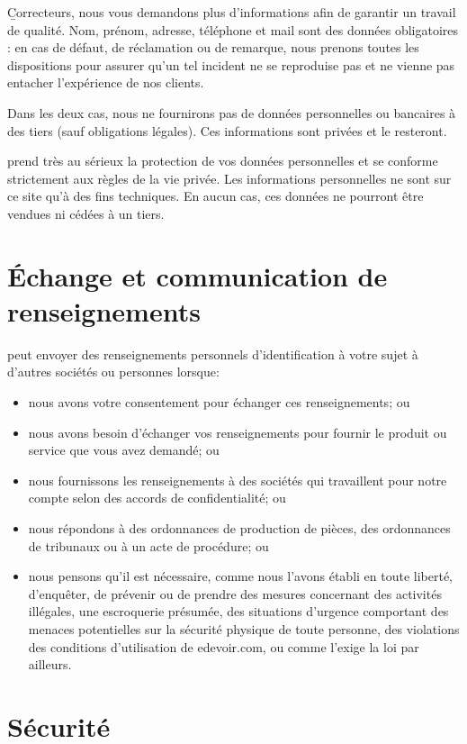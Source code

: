 \b{Correcteurs}, nous vous demandons plus d'informations afin de garantir un travail de qualité.  Nom, prénom, adresse, téléphone et mail sont des données obligatoires : en cas de défaut, de réclamation ou de remarque, nous prenons toutes les dispositions pour assurer qu'un tel incident ne se reproduise pas et ne vienne pas entacher l'expérience de nos clients.

Dans les deux cas, nous ne fournirons pas de données personnelles ou bancaires à des tiers (sauf obligations légales). Ces informations sont privées et le resteront.

\eDevoir prend très au sérieux la protection de vos données personnelles et se conforme strictement aux règles de la vie privée. Les informations personnelles ne sont sur ce site qu'à des fins techniques. En aucun cas, ces données ne pourront être vendues ni cédées à un tiers.

\section{Échange et communication de renseignements}

\eDevoir peut envoyer des renseignements personnels d'identification à votre sujet à d'autres sociétés ou personnes lorsque:
\begin{itemize}
 \item nous avons votre consentement pour échanger ces renseignements; ou
 \item nous avons besoin d'échanger vos renseignements pour fournir le produit ou service que vous avez demandé; ou
 \item nous fournissons les renseignements à des sociétés qui travaillent pour notre compte selon des accords de confidentialité; ou
 \item nous répondons à des ordonnances de production de pièces, des ordonnances de tribunaux ou à un acte de procédure; ou
 \item nous pensons qu'il est nécessaire, comme nous l'avons établi en toute liberté, d'enquêter, de prévenir ou de prendre des mesures concernant des activités illégales, une escroquerie présumée, des situations d'urgence comportant des menaces potentielles sur la sécurité physique de toute personne, des violations des conditions d'utilisation de edevoir.com, ou comme l'exige la loi par ailleurs.
\end{itemize}

\section{Sécurité}

